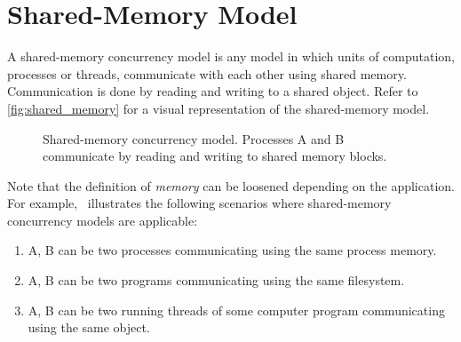 \section{Shared-Memory Model\label{sec:shared_memory}}
A shared-memory concurrency model is any model in which units of computation,
processes or threads, communicate with each other using shared memory.
Communication is done by reading and writing to a shared object. Refer to
\autoref{fig:shared_memory} for a visual representation of the shared-memory model.

\begin{figure}[!htb]
    \centering
      \caption{
        Shared-memory concurrency model. 
        Processes A and B communicate by reading and writing to shared memory blocks.
      }
      \label{fig:shared_memory}
\end{figure}

Note that the definition of \textit{memory} can be loosened depending on the application.
For example,~\cite{mitConcurrency} illustrates the following scenarios
where shared-memory concurrency models are applicable:

\begin{enumerate}
    \item A, B can be two processes communicating using the same process memory.
    \item A, B can be two programs communicating using the same filesystem.
    \item \label{itm:shared_object} A, B can be two running threads of some computer program
        communicating using the same object.
\end{enumerate}

